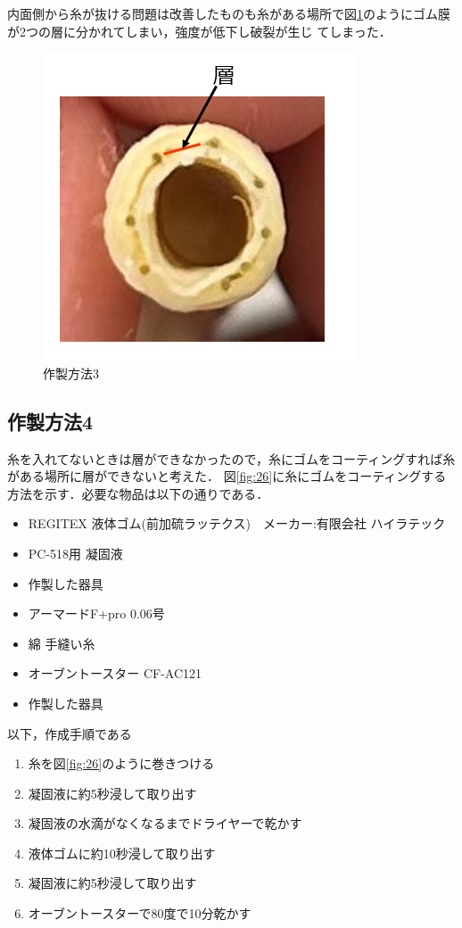 内面側から糸が抜ける問題は改善したものも糸がある場所で図\ref{fig:25}のようにゴム膜が2つの層に分かれてしまい，強度が低下し破裂が生じ
てしまった．
\begin{figure}[t]
  \centering  %
  \includegraphics[scale=0.8]{pic/24.PNG}
  \caption{作製方法3}
  \label{fig:25}
\end{figure}
\subsection{作製方法4}
糸を入れてないときは層ができなかったので，糸にゴムをコーティングすれば糸がある場所に層ができないと考えた．
図\ref{fig:26}に糸にゴムをコーティングする方法を示す．必要な物品は以下の通りである．
\begin{itemize}
  \item REGITEX 液体ゴム(前加硫ラッテクス)　メーカー:有限会社 ハイラテック
  \item PC-518用 凝固液
  \item 作製した器具
  \item アーマードF+pro 0.06号
  \item 綿 手縫い糸
  \item オーブントースター CF-AC121
  \item 作製した器具
\end{itemize}
以下，作成手順である
\begin{enumerate}
  \item 糸を図\ref{fig:26}のように巻きつける
  \item 凝固液に約5秒浸して取り出す
  \item 凝固液の水滴がなくなるまでドライヤーで乾かす
  \item 液体ゴムに約10秒浸して取り出す
  \item 凝固液に約5秒浸して取り出す
  \item オーブントースターで80度で10分乾かす
\end{enumerate}

